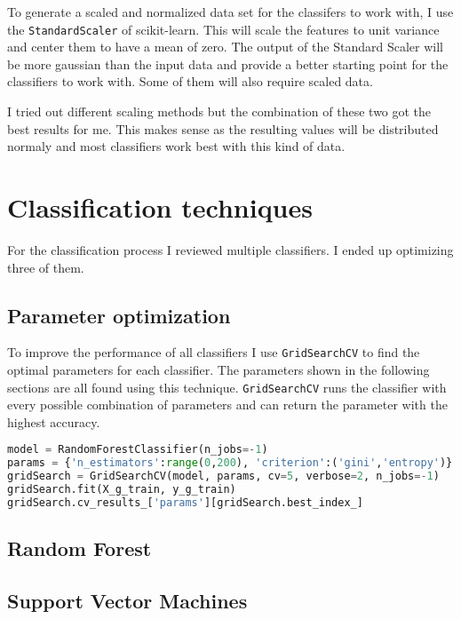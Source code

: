 To generate a scaled and normalized data set for the classifers to work with, I use the \texttt{StandardScaler} of scikit-learn. This will scale the features to unit variance and center them to have a mean of zero. The output of the Standard Scaler will be more gaussian than the input data and provide a better starting point for the classifiers to work with. Some of them will also require scaled data.

I tried out different scaling methods but the combination of these two got the best results for me. This makes sense as the resulting values will be distributed normaly and most classifiers work best with this kind of data.


\section{Classification techniques}

For the classification process I reviewed multiple classifiers. I ended up optimizing three of them. 

\subsection{Parameter optimization}

To improve the performance of all classifiers I use \texttt{GridSearchCV} to find the optimal parameters for each classifier. The parameters shown in the following sections are all found using this technique. \texttt{GridSearchCV} runs the classifier with every possible combination of parameters and can return the parameter with the highest accuracy.

\begin{lstlisting}[language=Python, caption={Example use of \texttt{GridSearchCV} for the random forest classifier}]
model = RandomForestClassifier(n_jobs=-1)
params = {'n_estimators':range(0,200), 'criterion':('gini','entropy')}
gridSearch = GridSearchCV(model, params, cv=5, verbose=2, n_jobs=-1)
gridSearch.fit(X_g_train, y_g_train)
gridSearch.cv_results_['params'][gridSearch.best_index_]
\end{lstlisting}

\subsection{Random Forest}

\subsection{Support Vector Machines}

